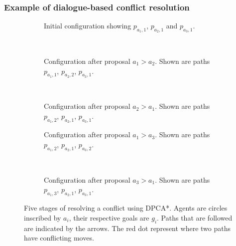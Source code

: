 \subsubsection{Example of dialogue-based conflict resolution}

\begin{figure}
    \centering
    \begin{subfigure}[t]{.3\textwidth}
        \centering
        \def\svgscale{.6}
        
        \caption{Initial configuration showing $p_{a_1,1}$, $p_{a_2,1}$ and 
            $p_{a_3,1}$.}
        \label{fig:example-initial}
    \end{subfigure}
    ~
    \begin{subfigure}[t]{.3\textwidth}
        \centering
        \def\svgscale{.6}
        
        \caption{Configuration after proposal $a_1 > a_2$. Shown are paths 
        $p_{a_1,1}$, $p_{a_2,2}$, $p_{a_3,1}$.}
        \label{fig:example2}
    \end{subfigure}
    ~
    \begin{subfigure}[t]{.3\textwidth}
        \centering
        \def\svgscale{.6}
        
        \caption{Configuration after proposal $a_2 > a_1$. Shown are paths 
        $p_{a_1,2}$, $p_{a_2,1}$, $p_{a_3,1}$.}
        \label{fig:example3}
    \end{subfigure}
    
    \begin{subfigure}[t]{.45\textwidth}
        \centering
        \def\svgscale{.6}
        
        \caption{Configuration after proposal $a_1 > a_3$. Shown are paths 
        $p_{a_1,2}$, $p_{a_2,1}$, $p_{a_3,2}$.}
        \label{fig:example4}
    \end{subfigure}
    ~
    \begin{subfigure}[t]{.45\textwidth}
        \centering
        \def\svgscale{.6}
        
        \caption{Configuration after proposal $a_3 > a_1$. Shown are paths 
        $p_{a_1,3}$, $p_{a_2,1}$, $p_{a_3,1}$.}
        \label{fig:example5}
    \end{subfigure}
    
    \caption{Five stages of resolving a conflict using DPCA*. Agents are 
    circles inscribed
        by $a_i$, their respective goals are $g_i$. Paths that are followed are
        indicated by the arrows. The red dot represent where two paths have
        conflicting moves.}
    \label{fig:example}
\end{figure}


